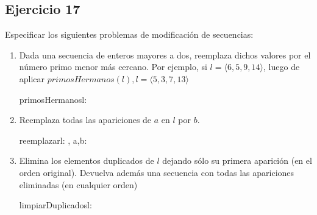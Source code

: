 \subsection{Ejercicio 17}
Especificar los siguientes problemas de modificación de secuencias:

\begin{enumerate}[label=\alph*)]
      \item Dada una secuencia de enteros mayores a dos, reemplaza dichos valores por el número primo menor más cercano. Por ejemplo, si $l = \langle 6, 5, 9, 14 \rangle$, luego de aplicar $primosHermanos(l), l = \langle 5, 3, 7, 13 \rangle$

            \begin{proc}{primosHermanos}{\Inout l: \TLista{\ent}}{}

            \end{proc}

      \item Reemplaza todas las apariciones de $a$ en $l$ por $b$.

            \begin{proc}{reemplazar}{\Inout l: \seqchar, \In a,b: \cha}{}
            \end{proc}

      \item Elimina los elementos duplicados de $l$ dejando sólo su primera aparición (en el orden original). Devuelva además una secuencia con todas las apariciones eliminadas (en cualquier orden)

            \begin{proc}{limpiarDuplicados}{\Inout l: \seqchar}{\seqchar}
                  \asegura{} \hacer
            \end{proc}
\end{enumerate}

